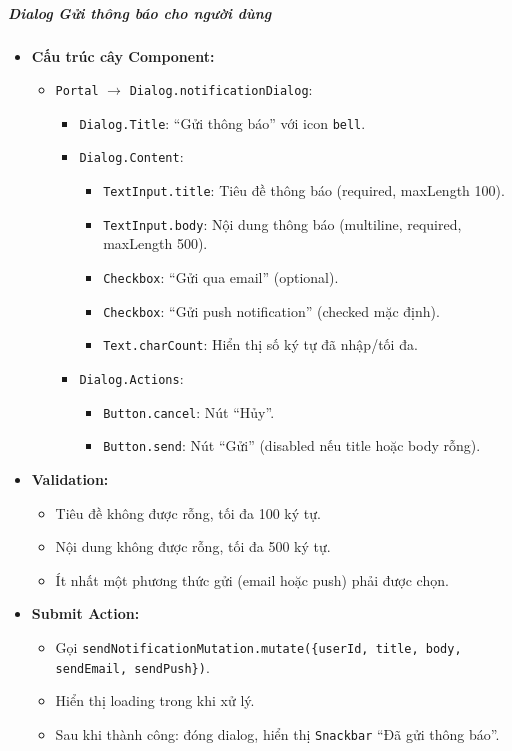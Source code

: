 \subparagraph{Dialog Gửi thông báo cho người dùng}
\begin{itemize}
    \item \textbf{Cấu trúc cây Component:}
        \begin{itemize}
            \item \texttt{Portal} $\rightarrow$ \texttt{Dialog.notificationDialog}:
                \begin{itemize}
                    \item \texttt{Dialog.Title}: ``Gửi thông báo'' với icon \texttt{bell}.
                    \item \texttt{Dialog.Content}:
                        \begin{itemize}
                            \item \texttt{TextInput.title}: Tiêu đề thông báo (required, maxLength 100).
                            \item \texttt{TextInput.body}: Nội dung thông báo (multiline, required, maxLength 500).
                            \item \texttt{Checkbox}: ``Gửi qua email'' (optional).
                            \item \texttt{Checkbox}: ``Gửi push notification'' (checked mặc định).
                            \item \texttt{Text.charCount}: Hiển thị số ký tự đã nhập/tối đa.
                        \end{itemize}
                    \item \texttt{Dialog.Actions}:
                        \begin{itemize}
                            \item \texttt{Button.cancel}: Nút ``Hủy''.
                            \item \texttt{Button.send}: Nút ``Gửi'' (disabled nếu title hoặc body rỗng).
                        \end{itemize}
                \end{itemize}
        \end{itemize}
    \item \textbf{Validation:}
        \begin{itemize}
            \item Tiêu đề không được rỗng, tối đa 100 ký tự.
            \item Nội dung không được rỗng, tối đa 500 ký tự.
            \item Ít nhất một phương thức gửi (email hoặc push) phải được chọn.
        \end{itemize}
    \item \textbf{Submit Action:}
        \begin{itemize}
            \item Gọi \texttt{sendNotificationMutation.mutate(\{userId, title, body, sendEmail, sendPush\})}.
            \item Hiển thị loading trong khi xử lý.
            \item Sau khi thành công: đóng dialog, hiển thị \texttt{Snackbar} ``Đã gửi thông báo''.
        \end{itemize}
\end{itemize}
